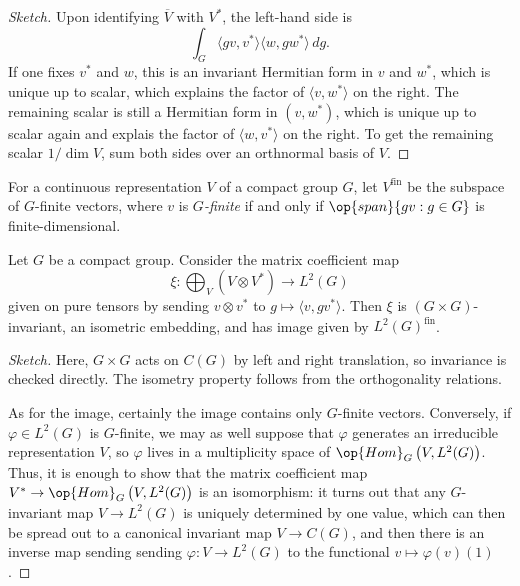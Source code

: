 \documentclass{article}
\begin{document}
\begin{proof}[Sketch]
	Upon identifying $\overline V$ with $V^*$, the left-hand side is
	\[\int_G\langle gv,v^*\rangle\langle w,gw^*\rangle\,dg.\]
	If one fixes $v^*$ and $w$, this is an invariant Hermitian form in $v$ and $w^*$, which is unique up to scalar, which explains the factor of $\langle v,w^*\rangle$ on the right. The remaining scalar is still a Hermitian form in $(v,w^*)$, which is unique up to scalar again and explais the factor of $\langle w,v^*\rangle$ on the right. To get the remaining scalar $1/\dim V$, sum both sides over an orthnormal basis of $V$.
\end{proof}
\begin{definition}[finite]
	For a continuous representation $V$ of a compact group $G$, let $V^{\mathrm{fin}}$ be the subspace of $G$-finite vectors, where $v$ is \textit{$G$-finite} if and only if $\op{span}\{gv:g\in G\}$ is finite-dimensional.
\end{definition}
\begin{corollary}
	Let $G$ be a compact group. Consider the matrix coefficient map
	\[\xi\colon\bigoplus_V(V\otimes V^*)\to L^2(G)\]
	given on pure tensors by sending $v\otimes v^*$ to $g\mapsto\langle v,gv^*\rangle$. Then $\xi$ is $(G\times G)$-invariant, an isometric embedding, and has image given by $L^2(G)^{\mathrm{fin}}$.
\end{corollary}
\begin{proof}[Sketch]
	Here, $G\times G$ acts on $C(G)$ by left and right translation, so invariance is checked directly. The isometry property follows from the orthogonality relations.
	
	As for the image, certainly the image contains only $G$-finite vectors. Conversely, if $\varphi\in L^2(G)$ is $G$-finite, we may as well suppose that $\varphi$ generates an irreducible representation $V$, so $\varphi$ lives in a multiplicity space of $\op{Hom}_G\left(V,L^2(G)\right)$. Thus, it is enough to show that the matrix coefficient map $V^*\to\op{Hom}_G\left(V,L^2(G)\right)$ is an isomorphism: it turns out that any $G$-invariant map $V\to L^2(G)$ is uniquely determined by one value, which can then be spread out to a canonical invariant map $V\to C(G)$, and then there is an inverse map sending sending $\varphi\colon V\to L^2(G)$ to the functional $v\mapsto\varphi(v)(1)$.
\end{proof}
\end{document}
